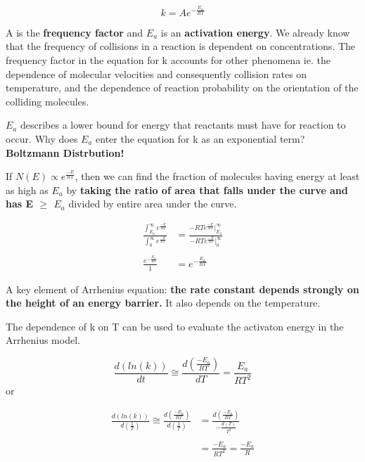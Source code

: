 \documentclass[12pt, letterpaper]{article}
\begin{document}
\begin{equation}
    k = Ae^{-\frac{E_a}{RT}}
\end{equation}

A is the \textbf{frequency factor} and $E_a$ is an \textbf{activation energy}. 
We already know that the frequency of collisions in a reaction is dependent on concentrations. 
The frequency factor in the equation for k accounts for other phenomena ie. the dependence of molecular
velocities and consequently collision rates on temperature, and the dependence of reaction probability on 
the orientation of the colliding molecules. 

\textbf{$E_a$} describes a lower bound for energy that reactants must have for reaction to occur. Why does $E_a$ 
enter the equation for k as an exponential term? \textbf{Boltzmann Distrbution!}

If \( N(E) \propto e^{\frac{-E}{RT}} \), then we can find the fraction of molecules having energy at least as high as $E_a$ by 
\textbf{taking the ratio of area that falls under the curve and has E $\geq$ $E_a$} divided by entire area under the curve. 

\begin{align*}
    \frac{\int_{E_a}^{\infty}  e^{\frac{-E}{RT}}}{\int_{0}^{\infty}  e^{\frac{-E}{RT}}} &= \frac{-RTe^{\frac{-E}{RT}} |_{E_a}^{\infty}}{-RTe^{\frac{-E}{RT}}|_{0}^{\infty}} \\ \\
    \frac{e^{-\frac{E_a}{RT}}}{1} &= e^{-\frac{E_a}{RT}}
\end{align*}

A key element of Arrhenius equation: \textbf{the rate constant depends strongly on the height of an energy barrier.} 
It also depends on the temperature.

\newpage
The dependence of k on T can be used to evaluate the activaton energy in the Arrhenius model. 

\begin{equation*}
    \frac{d(ln(k))}{dt} \cong \frac{d(\frac{-E_a}{RT})}{dT} = \frac{E_a}{RT^2}
\end{equation*}
or 

\begin{align*}
    \frac{d(ln(k))}{d(\frac{1}{T})} \cong \frac{d(\frac{-E_a}{RT})}{d(\frac{1}{T})} &= \frac{d(\frac{-E_a}{RT})}{-\frac{d(T)}{T^2}} \\ \\ 
    &= \frac{-E_a}{RT^2} = \frac{-E_a}{R}
\end{align*}
\end{document}
